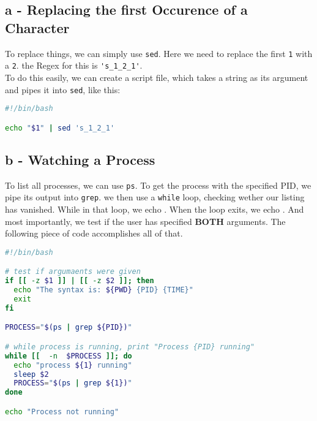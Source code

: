 \documentclass[a4paper, 11pt]{article}
\begin{document}
    \subsection{a - Replacing the first Occurence of a Character}
    To replace things, we can simply use \texttt{sed}. Here we need to replace the first \texttt{1} 
    with a \texttt{2}. the Regex for this is \lstset{language=Bash}\lstinline{'s_1_2_1'}.\\
    To do this easily, we can create a script file, which takes a string as its argument and pipes 
    it into \texttt{sed}, like this:
    \begin{lstlisting}[language=Bash]
#!/bin/bash

echo "$1" | sed 's_1_2_1'
    \end{lstlisting}

    \subsection{b - Watching a Process}
    To list all processes, we can use \texttt{ps}. To get the process with the specified PID, we pipe
    its output into \texttt{grep}. we then use a \texttt{while} loop, checking wether our listing has vanished. 
    While in that loop, we echo \texttt{}.
    When the loop exits, we echo \texttt{\color{stringColor}{"Process not running."}}. And most importantly, we
    test if the user has specified \textbf{BOTH} arguments. The following piece of code accomplishes all of that.

    \begin{lstlisting}[language=Bash,caption={The Bash code that keeps on giving}]
#!/bin/bash

# test if argumaents were given
if [[ -z $1 ]] | [[ -z $2 ]]; then
  echo "The syntax is: ${PWD} {PID} {TIME}"
  exit
fi

PROCESS="$(ps | grep ${PID})"

# while process is running, print "Process {PID} running"
while [[  -n  $PROCESS ]]; do
  echo "process ${1} running"
  sleep $2
  PROCESS="$(ps | grep ${1})"
done

echo "Process not running"
    \end{lstlisting}
    \newpage

\end{document}
